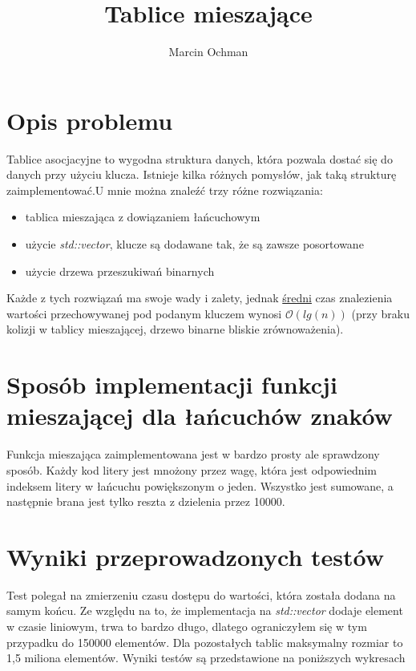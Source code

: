 \documentclass[10pt,a4paper]{article}
\author{Marcin Ochman}
\title{Tablice mieszające}
\begin{document}
\maketitle
\section{Opis problemu}

Tablice asocjacyjne to wygodna struktura danych, która pozwala dostać się do danych przy użyciu
klucza. Istnieje kilka różnych pomysłów, jak taką strukturę zaimplementować.U mnie można znaleźć
trzy różne rozwiązania:
\begin{itemize}
\item tablica mieszająca z dowiązaniem łańcuchowym
\item użycie \textit{std::vector}, klucze są dodawane tak, że są zawsze posortowane
\item użycie drzewa przeszukiwań binarnych
\end{itemize}

Każde z tych rozwiązań ma swoje wady i zalety, jednak \underline{średni} czas znalezienia wartości
przechowywanej pod podanym kluczem wynosi $\mathcal{O}(lg(n))$ (przy braku kolizji w tablicy
mieszającej, drzewo binarne bliskie zrównoważenia).


\section{Sposób implementacji funkcji mieszającej dla łańcuchów znaków}

Funkcja mieszająca zaimplementowana jest w bardzo prosty ale sprawdzony sposób.
Każdy kod litery jest mnożony przez wagę, która jest odpowiednim indeksem litery w łańcuchu
powiększonym o jeden. Wszystko jest sumowane, a następnie brana jest tylko reszta z dzielenia przez 10000.

\section{Wyniki przeprowadzonych testów}

Test polegał na zmierzeniu czasu dostępu do wartości, która została dodana na samym końcu.
Ze względu na to, że implementacja na \textit{std::vector} dodaje element w czasie
liniowym, trwa to bardzo długo, dlatego ograniczyłem się w tym przypadku do 150000
elementów. Dla pozostałych tablic maksymalny rozmiar to 1,5 miliona elementów. Wyniki testów są
przedstawione na poniższych wykresach
\end{document}
